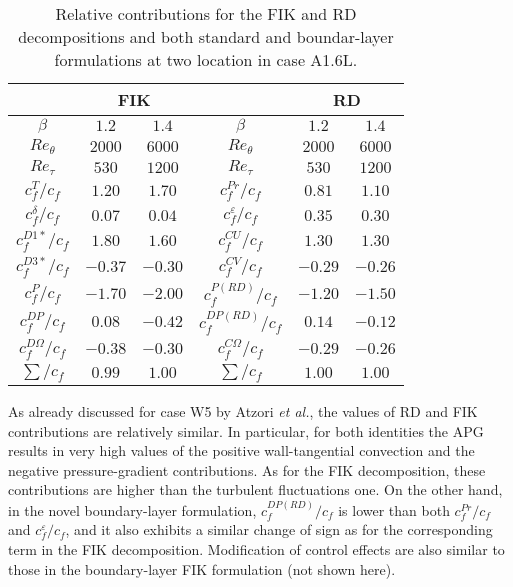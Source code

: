 \begin{table}
\caption{\label{tab:RDcontrol2}Relative contributions for the FIK and RD decompositions and both standard and boundar-layer formulations at two location in case A1.6L.}
\centering
\begin{tabular}{cccccc}
\hline \hline
 &\multicolumn{2}{c}{FIK} &&\multicolumn{2}{c}{RD}\\  \hline
$\beta$ & $1.2$ & $1.4$  & $\beta$ & $1.2$ & $1.4$ \\ 
$Re_\theta$ & $2000$ & $6000$ & $Re_\theta$ & $2000$ & $6000$ \\ 
$Re_\tau$ & $530$ & $1200$ & $Re_\tau$ & $530$ & $1200$ \\  \hline 
$c^T_f/c_f$ & $1.20$ & $1.70$ & $c^{Pr}_f/c_f$ & $0.81$ & $1.10$ \\  
$c^\delta_f/c_f$ & $0.07$ & $0.04$ &$c^{\varepsilon}_f/c_f$ & $0.35$ & $0.30$ \\  \hline 
$c^{D1*}_f/c_f$ & $1.80$ & $1.60$  &$c^{CU}_f/c_f$ & $1.30$ & $1.30$ \\
$c^{D3*}_f/c_f$ & $-0.37$ & $-0.30$  &$c^{CV}_f/c_f$ & $-0.29$ & $-0.26$ \\
$c^{P}_f/c_f$ & $-1.70$ & $-2.00$  &$c^{P(RD)}_f/c_f$ & $-1.20$ & $-1.50$ \\  \hline
$c^{DP}_f/c_f$ & $0.08$ & $-0.42$  &$c^{DP(RD)}_f/c_f$ & $0.14$ & $-0.12$ \\
$c^{D\Omega}_f/c_f$ & $-0.38$ & $-0.30$  &$c^{C\Omega}_f/c_f$ & $-0.29$ & $-0.26$ \\  \hline
$\sum/c_f$ & $0.99$ & $1.00$  &$\sum/c_f$ & $1.00$ & $1.00$ \\
\hline \hline
\end{tabular}
 
\end{table}

As already discussed for case W5 by Atzori \textit{et al.}\cite{atzo21b}, the values of RD and FIK contributions are relatively similar. In particular, for both identities the APG results in very high values of the positive wall-tangential convection and the negative pressure-gradient contributions. As for the FIK decomposition, these contributions are higher than the turbulent fluctuations one. On the other hand, in the novel boundary-layer formulation, $c^{DP(RD)}_f/c_f$ is lower than both $c^{Pr}_f/c_f$ and $c^{\varepsilon}_f/c_f$, and it also exhibits a similar change of sign as for the corresponding term in the FIK decomposition. Modification of control effects are also similar to those in the boundary-layer FIK formulation (not shown here). 



% 
%
